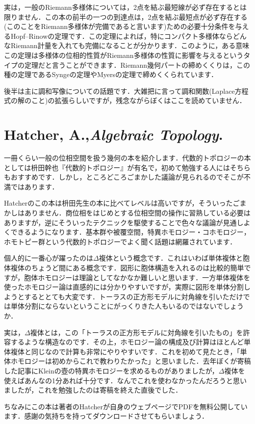 \documentclass[uplatex]{jsarticle}
\begin{document}
実は，一般のRiemann多様体については，2点を結ぶ最短線が必ず存在するとは限りません．この本の前半の一つの到達点は，2点を結ぶ最短点が必ず存在する(このことをRiemann多様体が完備であると言います)ための必要十分条件を与えるHopf--Rinowの定理です．この定理によれば，特にコンパクト多様体ならどんなRiemann計量を入れても完備になることが分かります．このように，ある意味この定理は多様体の位相的性質がRiemann多様体の性質に影響を与えるというタイプの定理だと言うことができます．Riemann幾何パートの締めくくりは，この種の定理であるSyngeの定理やMyersの定理で締めくくられています．

後半は主に調和写像についての話題です．大雑把に言って調和関数(Laplace方程式の解のこと)の拡張らしいですが，残念ながらぼくはここを読めていません．

\section*{Hatcher, A.,\textit{Algebraic Topology}.}

一冊くらい一般の位相空間を扱う幾何の本を紹介します．代数的トポロジーの本としては枡田幹也『代数的トポロジー』が有名で，初めて勉強する人にはそちらもおすすめです．しかし，ところどころごまかした議論が見られるのでそこが不満ではあります．

Hatcherのこの本は枡田先生の本に比べてレベルは高いですが，そういったごまかしはありません．商位相をはじめとする位相空間の操作に習熟している必要はありますが，逆にそういったテクニックを駆使することで色々な議論が見通しよくできるようになります．基本群や被覆空間，特異ホモロジー・コホモロジー，ホモトピー群という代数的トポロジーでよく聞く話題は網羅されています．

個人的に一番心が躍ったのは$\Delta$複体という概念です．これはいわば単体複体と胞体複体のちょうど間にある概念です．図形に胞体構造を入れるのは比較的簡単ですが，胞体ホモロジーは理論としてなかなか難しいと思います．一方単体複体を使ったホモロジー論は直感的には分かりやすいですが，実際に図形を単体分割しようとするととても大変です．トーラスの正方形モデルに対角線を引いただけでは単体分割にならないということにがっくりきた人もいるのではないでしょうか．

実は，$\Delta$複体とは，この「トーラスの正方形モデルに対角線を引いたもの」を許容するような構造なのです．その上，ホモロジー論の構成及び計算はほとんど単体複体と同じなので計算も非常にやりやすいです．これを初めて見たとき，「単体ホモロジーは初めからこれで教わりたかった」と思いました．去年ぼくが寄稿した記事にKleinの壺の特異ホモロジーを求めるものがありましたが，$\Delta$複体を使えばあんなの1分あれば十分です．なんでこれを使わなかったんだろうと思いましたが，これを勉強したのは寄稿を終えた直後でした．

ちなみにこの本は著者のHatcherが自身のウェブページでPDFを無料公開しています．感謝の気持ちを持ってダウンロードさせてもらいましょう．
\end{document}
